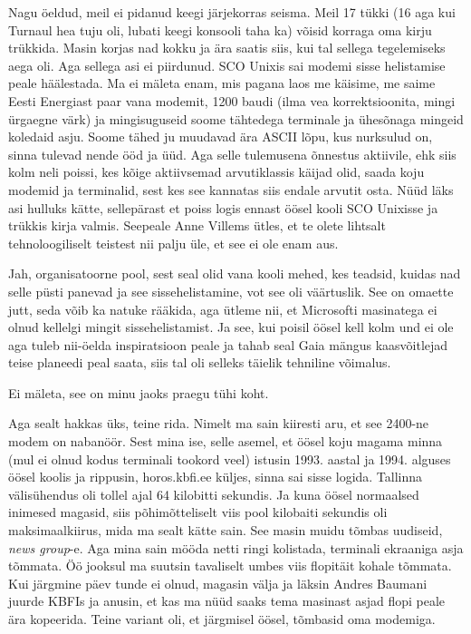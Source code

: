 Nagu öeldud, meil ei pidanud keegi järjekorras seisma. Meil 17 tükki (16 aga 
kui Turnaul hea tuju oli, lubati keegi konsooli taha 
ka) võisid korraga oma kirju trükkida. Masin korjas nad kokku ja ära saatis 
siis, kui tal sellega tegelemiseks aega oli. Aga sellega asi ei piirdunud. SCO 
Unixis sai modemi sisse helistamise peale häälestada. Ma ei 
mäleta enam, mis pagana laos me käisime, me saime Eesti Energiast paar vana modemit, 1200 baudi (ilma vea korrektsioonita, mingi 
ürgaegne värk) ja mingisuguseid soome tähtedega terminale ja ühesõnaga mingeid 
koledaid asju. Soome tähed ju muudavad ära ASCII lõpu, kus nurksulud on, sinna 
tulevad nende ööd ja üüd. Aga selle tulemusena õnnestus aktiivile, ehk siis 
kolm neli poissi, kes kõige aktiivsemad arvutiklassis käijad olid, saada koju 
modemid ja terminalid, sest kes see kannatas siis endale arvutit osta. Nüüd 
läks asi hulluks kätte, sellepärast et poiss logis ennast öösel kooli SCO 
Unixisse ja trükkis kirja valmis.  Seepeale Anne Villems ütles, et te olete lihtsalt tehnoloogiliselt teistest nii palju üle, et 
see ei ole enam aus. 


Jah, organisatoorne pool, sest seal olid vana kooli mehed, kes teadsid, kuidas 
nad selle püsti panevad ja see sissehelistamine, vot see oli väärtuslik. See on 
omaette jutt, seda võib ka natuke rääkida, aga ütleme nii, et  Microsofti 
masinatega ei olnud kellelgi mingit sissehelistamist. Ja see, kui poisil öösel 
kell kolm und ei ole aga tuleb nii-öelda  inspiratsioon peale ja tahab seal 
Gaia mängus kaasvõitlejad teise planeedi peal saata, siis tal oli selleks 
täielik tehniline võimalus. 


Ei mäleta, see on minu jaoks praegu tühi koht. 

Aga sealt hakkas üks, teine rida. Nimelt ma sain kiiresti aru, et see 2400-ne  
modem on nabanöör. Sest mina ise, selle asemel, et öösel koju magama minna (mul 
ei olnud kodus terminali tookord veel)  istusin 1993. aastal ja  1994. alguses 
öösel koolis ja rippusin, horos.kbfi.ee küljes, sinna sai 
sisse logida. Tallinna välisühendus oli tollel ajal 64 kilobitti sekundis. Ja 
kuna öösel normaalsed inimesed magasid, siis põhimõtteliselt viis pool 
kilobaiti sekundis oli maksimaalkiirus, mida ma sealt kätte sain. See masin 
muidu tõmbas uudiseid, \emph{news group}-e. Aga mina sain mööda netti ringi 
kolistada,  terminali ekraaniga asja tõmmata. Öö jooksul ma suutsin tavaliselt 
umbes viis flopitäit kohale tõmmata. Kui  järgmine päev tunde ei olnud, magasin 
välja ja läksin Andres Baumani juurde 
KBFIs ja anusin, et kas ma nüüd saaks tema masinast asjad flopi 
peale ära kopeerida. Teine variant oli, et järgmisel öösel, tõmbasid oma 
modemiga. 

